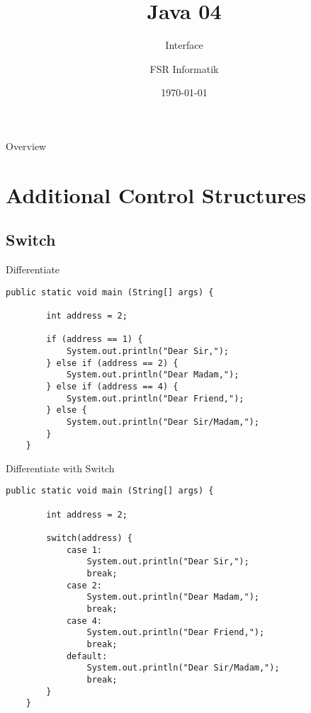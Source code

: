 

\title{Java 04}
\subtitle{Interface}
\author{FSR Informatik}
\date{\today}



\begin{frame}
\titlepage
\end{frame}
\begin{frame}{Overview}
\tableofcontents
\end{frame}

\section{Additional Control Structures}
\subsection{Switch}
\begin{frame}[fragile]{Differentiate}
	\begin{lstlisting}[basicstyle=\ttfamily\scriptsize]
	public static void main (String[] args) {
	
	    int address = 2;
	    	
	    if (address == 1) {
	        System.out.println("Dear Sir,");	    
	    } else if (address == 2) {
	        System.out.println("Dear Madam,");		    
	    } else if (address == 4) {
	        System.out.println("Dear Friend,");		    
	    } else {
	        System.out.println("Dear Sir/Madam,");	
	    }
	}
	\end{lstlisting}
\end{frame}
\begin{frame}[fragile]{Differentiate with Switch}
	\begin{lstlisting}[basicstyle=\ttfamily\scriptsize]
	public static void main (String[] args) {
	
	    int address = 2;
	    
	    switch(address) {
	        case 1:
	            System.out.println("Dear Sir,");
	            break;
	        case 2:
	            System.out.println("Dear Madam,");
	            break;
	        case 4:
	            System.out.println("Dear Friend,");
	            break; 
	        default:
	            System.out.println("Dear Sir/Madam,");
	            break;
	    }
	}
	\end{lstlisting}
\end{frame}
